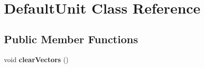 \hypertarget{class_default_unit}{}\section{Default\+Unit Class Reference}
\label{class_default_unit}
\subsection*{Public Member Functions}
\begin{DoxyCompactItemize}
\item 
\hypertarget{class_default_unit_a813d687486fe8a3399f2073d1b52baa0}{}void {\bfseries clear\+Vectors} ()\label{class_default_unit_a813d687486fe8a3399f2073d1b52baa0}

\end{DoxyCompactItemize}
